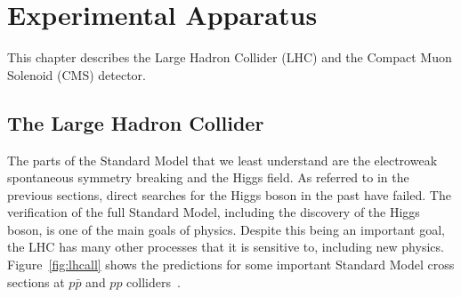 

\chapter{Experimental Apparatus}

This chapter describes the Large Hadron Collider (LHC) and the Compact Muon Solenoid (CMS) detector.


\section{The Large Hadron Collider}

The parts of the Standard Model that we least understand are the electroweak spontaneous symmetry breaking and the Higgs field.  As referred to in the previous sections, direct searches for the Higgs boson in the past have failed. The verification of the full Standard Model, including the discovery of the Higgs boson, is one of the main goals of physics.  Despite this being an important goal, the LHC has many other processes that it is sensitive to, including new physics. Figure~\ref{fig:lhcall} shows the predictions for some important Standard Model cross sections at  $p \bar p$ and  $pp$  colliders~\cite{Campbell:2006wx}. 

